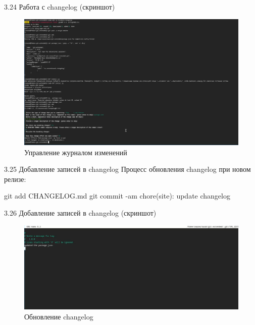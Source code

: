 \documentclass[
  ignorenonframetext,
  aspectratio=169,
  russian,
]{beamer}
\newenvironment{Shaded}{\begin{snugshade}}{\end{snugshade}}
\newcommand{\AttributeTok}[1]{\textcolor[rgb]{0.40,0.45,0.13}{#1}}
\newcommand{\FunctionTok}[1]{\textcolor[rgb]{0.28,0.35,0.67}{#1}}
\newcommand{\NormalTok}[1]{\textcolor[rgb]{0.00,0.23,0.31}{#1}}
\newcommand{\StringTok}[1]{\textcolor[rgb]{0.13,0.47,0.30}{#1}}
\begin{document}
\begin{frame}{3.24 Работа с changelog (скриншот)}
\label{ux440ux430ux431ux43eux442ux430-ux441-changelog-ux441ux43aux440ux438ux43dux448ux43eux442}
\begin{figure}[H]

{\centering \includegraphics[width=0.8\linewidth,height=\textheight,keepaspectratio]{image/changelog.png}

}

\caption{Управление журналом изменений}

\end{figure}%
\end{frame}

\begin{frame}[fragile]{3.25 Добавление записей в changelog}
\label{ux434ux43eux431ux430ux432ux43bux435ux43dux438ux435-ux437ux430ux43fux438ux441ux435ux439-ux432-changelog}
Процесс обновления changelog при новом релизе:

\begin{Shaded}
\begin{Highlighting}[]
\FunctionTok{git}\NormalTok{ add CHANGELOG.md}
\FunctionTok{git}\NormalTok{ commit }\AttributeTok{{-}am} \StringTok{\textquotesingle{}chore(site): update changelog\textquotesingle{}}
\end{Highlighting}
\end{Shaded}
\end{frame}

\begin{frame}{3.26 Добавление записей в changelog (скриншот)}
\label{ux434ux43eux431ux430ux432ux43bux435ux43dux438ux435-ux437ux430ux43fux438ux441ux435ux439-ux432-changelog-ux441ux43aux440ux438ux43dux448ux43eux442}
\begin{figure}[H]

{\centering \includegraphics[width=0.8\linewidth,height=\textheight,keepaspectratio]{image/addChangelog.png}

}

\caption{Обновление changelog}

\end{figure}%
\end{frame}
\end{document}
